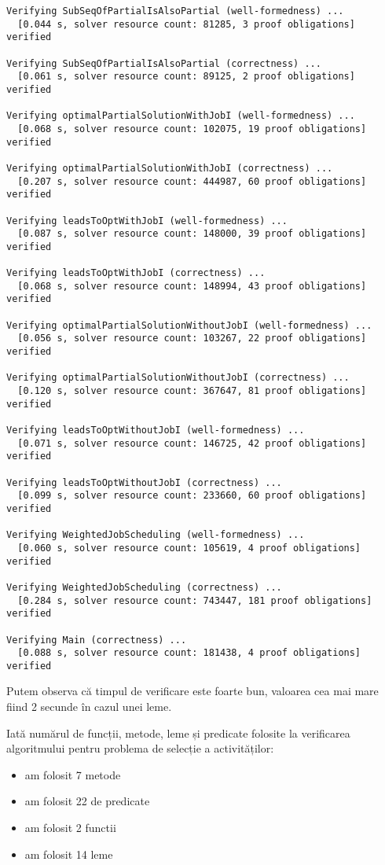 \begin{Verbatim}[fontsize=\footnotesize]
Verifying SubSeqOfPartialIsAlsoPartial (well-formedness) ...
  [0.044 s, solver resource count: 81285, 3 proof obligations]  verified

Verifying SubSeqOfPartialIsAlsoPartial (correctness) ...
  [0.061 s, solver resource count: 89125, 2 proof obligations]  verified

Verifying optimalPartialSolutionWithJobI (well-formedness) ...
  [0.068 s, solver resource count: 102075, 19 proof obligations]  verified

Verifying optimalPartialSolutionWithJobI (correctness) ...
  [0.207 s, solver resource count: 444987, 60 proof obligations]  verified

Verifying leadsToOptWithJobI (well-formedness) ...
  [0.087 s, solver resource count: 148000, 39 proof obligations]  verified

Verifying leadsToOptWithJobI (correctness) ...
  [0.068 s, solver resource count: 148994, 43 proof obligations]  verified

Verifying optimalPartialSolutionWithoutJobI (well-formedness) ...
  [0.056 s, solver resource count: 103267, 22 proof obligations]  verified

Verifying optimalPartialSolutionWithoutJobI (correctness) ...
  [0.120 s, solver resource count: 367647, 81 proof obligations]  verified

Verifying leadsToOptWithoutJobI (well-formedness) ...
  [0.071 s, solver resource count: 146725, 42 proof obligations]  verified

Verifying leadsToOptWithoutJobI (correctness) ...
  [0.099 s, solver resource count: 233660, 60 proof obligations]  verified

Verifying WeightedJobScheduling (well-formedness) ...
  [0.060 s, solver resource count: 105619, 4 proof obligations]  verified

Verifying WeightedJobScheduling (correctness) ...
  [0.284 s, solver resource count: 743447, 181 proof obligations]  verified

Verifying Main (correctness) ...
  [0.088 s, solver resource count: 181438, 4 proof obligations]  verified
\end{Verbatim}

Putem observa că timpul de verificare este foarte bun, valoarea cea mai mare  fiind 2 secunde în cazul unei leme. 

Iată numărul de funcții, metode, leme și predicate folosite la verificarea algoritmului pentru problema de selecție a activităților:
\begin{itemize}
    \item am folosit 7 metode
    \item am folosit 22 de predicate
    \item am folosit 2 functii
    \item am folosit 14 leme
\end{itemize}


